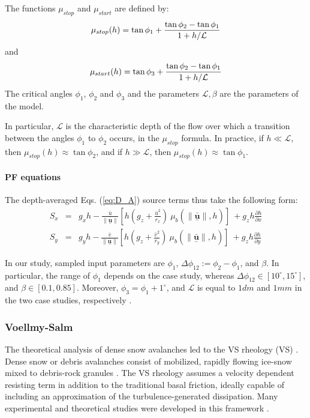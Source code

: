 \documentclass{article}
\begin{document}
The functions $\mu_{stop}$ and $\mu_{start}$ are defined by:
\begin{equation}\label{mu-stop}
\mu_{stop}(h)=\tan\phi_{1} + \frac{\tan\phi_{2}-\tan\phi_{1}}{1+h/\it \mathcal{L}}
\end{equation}
and
\begin{equation}\label{mu-start}
\mu_{start}(h)=\tan\phi_{3} + \frac{\tan\phi_{2}-\tan\phi_{1}}{1+h/\it \mathcal{L}}
\end{equation}
The critical angles $\phi_{1}$, $\phi_{2}$ and $\phi_{3}$ and the parameters $\mathcal{L}, \beta$ are the parameters of the model.

In particular, $\mathcal{L}$ is the characteristic depth of the flow over which a transition between the angles $\phi_{1}$ to $\phi_{2}$ occurs, in the $\mu_{stop}$ formula. In practice, if $h\ll \mathcal L$, then $\mu_{stop}(h)\approx \tan\phi_{2}$, and if $h\gg \mathcal L$, then $\mu_{stop}(h)\approx\tan\phi_{1}$.

\paragraph{PF equations} The depth-averaged Eqs. (\ref{eq:D_A}) source terms thus take the following form:
\begin{eqnarray}\label{eq:S_terms_PF}
S_{x} &=&  g_{x} h -  \frac{\bar{u}}{\| \underset{^\sim}{\bar{\textbf{u}}} \|}\left[h \left(g_z+\frac{\bar{u}^2}{r_x}\right) \ \mu_{b}(\|\underset{^\sim}{\bar{\textbf{u}}} \| , h)\right] \ + g_{z}h\frac{\partial h}{\partial x} \nonumber \\
S_{y} &=&  g_{y} h - \frac{\bar{v}}{\| \underset{^\sim}{\bar{\textbf{u}}} \|}\left[h \left(g_z +\frac{\bar{v}^2}{r_y}\right) \ \mu_{b}(\|\underset{^\sim}{\bar{\textbf{u}}} \| , h)\right] \ + g_{z}h\frac{\partial h}{\partial y}
\end{eqnarray}

In our study, sampled input parameters are $\phi_1$, $\Delta \phi_{12}:=\phi_2-\phi_1$, and $\beta$. In particular, the range of $\phi_1$ depends on the case study, whereas $\Delta \phi_{12} \in [10^{\mathrm{\circ}}, 15^{\mathrm{\circ}}]$, and $\beta \in [0.1, 0.85]$. Moreover, $\phi_3=\phi_1+1^\mathrm{\circ}$, and $\mathcal{L}$ is equal to $1 dm$ and $1 mm$ in the two case studies, respectively \citep{PouliquenForterre2002,ForterrePouliquen2003}.

\subsubsection{Voellmy-Salm}\label{VSM}
The theoretical analysis of dense snow avalanches led to the VS rheology (VS) \citep{Voellmy1955, Salm1990, Salm1993, Bartelt1999}. Dense snow or debris avalanches consist of mobilized, rapidly flowing ice-snow mixed to debris-rock granules \citep{BarteltMcArdell2009}. The VS rheology assumes a velocity dependent resisting term in addition to the traditional basal friction, ideally capable of including an approximation of the turbulence-generated dissipation. Many experimental and theoretical studies were developed in this framework \citep{Gruber2007, Kern2009, Christen2010, Fischer2012}.
\end{document}
